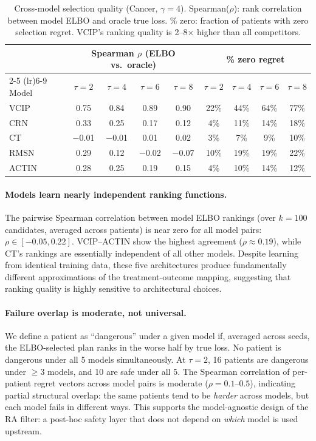 \documentclass{article}
\begin{document}
\begin{table}[h]
\centering
\caption{Cross-model selection quality (Cancer, $\gamma = 4$). Spearman($\rho$): rank correlation between model ELBO and oracle true loss. \% zero: fraction of patients with zero selection regret. VCIP's ranking quality is 2--8$\times$ higher than all competitors.}
\label{tab:cross_model_quality}
\small
\begin{tabular}{l cccc cccc}
\toprule
& \multicolumn{4}{c}{Spearman $\rho$ (ELBO vs.\ oracle)} & \multicolumn{4}{c}{\% zero regret} \\
\cmidrule(lr){2-5} \cmidrule(lr){6-9}
Model & $\tau{=}2$ & $\tau{=}4$ & $\tau{=}6$ & $\tau{=}8$ & $\tau{=}2$ & $\tau{=}4$ & $\tau{=}6$ & $\tau{=}8$ \\
\midrule
VCIP  & 0.75 & 0.84 & 0.89 & 0.90 & 22\% & 44\% & 64\% & 77\% \\
CRN   & 0.33 & 0.25 & 0.17 & 0.12 &  4\% & 11\% & 14\% & 18\% \\
CT    & $-$0.01 & $-$0.01 & 0.01 & 0.02 &  3\% &  7\% &  9\% & 10\% \\
RMSN  & 0.29 & 0.12 & $-$0.02 & $-$0.07 & 10\% & 19\% & 19\% & 22\% \\
ACTIN & 0.28 & 0.25 & 0.19 & 0.15 &  4\% & 10\% & 14\% & 12\% \\
\bottomrule
\end{tabular}
\end{table}

\paragraph{Models learn nearly independent ranking functions.} The pairwise Spearman correlation between model ELBO rankings (over $k = 100$ candidates, averaged across patients) is near zero for all model pairs: $\rho \in [-0.05, 0.22]$. VCIP--ACTIN show the highest agreement ($\rho \approx 0.19$), while CT's rankings are essentially independent of all other models. Despite learning from identical training data, these five architectures produce fundamentally different approximations of the treatment-outcome mapping, suggesting that ranking quality is highly sensitive to architectural choices.

\paragraph{Failure overlap is moderate, not universal.} We define a patient as ``dangerous'' under a given model if, averaged across seeds, the ELBO-selected plan ranks in the worse half by true loss. No patient is dangerous under all 5 models simultaneously. At $\tau{=}2$, 16 patients are dangerous under $\geq 3$ models, and 10 are safe under all 5. The Spearman correlation of per-patient regret vectors across model pairs is moderate ($\rho = 0.1$--$0.5$), indicating partial structural overlap: the same patients tend to be \emph{harder} across models, but each model fails in different ways. This supports the model-agnostic design of the RA filter: a post-hoc safety layer that does not depend on \emph{which} model is used upstream.
\end{document}
